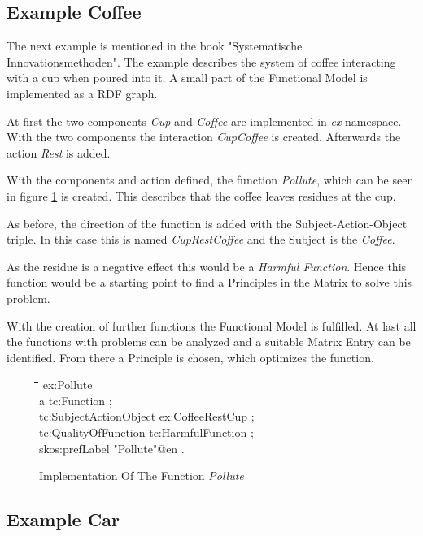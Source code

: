 \documentclass[11pt,a4paper]{article}
\newenvironment{code}{\tt \begin{tabbing}
\hskip12pt\=\hskip12pt\=\hskip12pt\=\hskip12pt\=\hskip5cm\=\hskip5cm\=\kill}
{\end{tabbing}}
\begin{document}
\subsection{Example Coffee}

The next example is mentioned in the book "Systematische Innovationsmethoden".
The example describes the system of coffee interacting with a cup when poured
into it.  A small part of the Functional Model is implemented as a RDF graph.

At first the two components \textit{Cup} and \textit{Coffee} are implemented
in \textit{ex} namespace.  With the two components the interaction
\textit{CupCoffee} is created.  Afterwards the action \textit{Rest} is added.

With the components and action defined, the function \textit{Pollute}, which
can be seen in figure \ref{fig:implementation_function_pollute} is created.
This describes that the coffee leaves residues at the cup.

As before, the direction of the function is added with the
Subject-Action-Object triple.  In this case this is named
\textit{CupRestCoffee} and the Subject is the \textit{Coffee}.

As the residue is a negative effect this would be a \textit{Harmful Function}.
Hence this function would be a starting point to find a Principles in the
Matrix to solve this problem.

With the creation of further functions the Functional Model is fulfilled.  At
last all the functions with problems can be analyzed and a suitable Matrix
Entry can be identified.  From there a Principle is chosen, which optimizes
the function.

\begin{figure}[ht]
  \centering
  \begin{code}
    ex:Pollute\\
    \> a tc:Function ;\\
    \> tc:SubjectActionObject ex:CoffeeRestCup ;\\
    \> tc:QualityOfFunction tc:HarmfulFunction ;\\
    \> skos:prefLabel "Pollute"@en .\\
  \end{code}
  \caption{Implementation Of The Function \textit{Pollute}}
  \label{fig:implementation_function_pollute}
\end{figure}

\subsection{Example Car}
\end{document}
